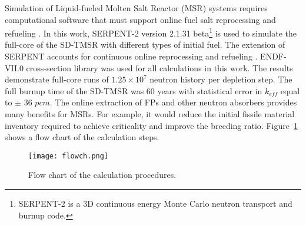 Simulation of Liquid-fueled Molten Salt Reactor (MSR) systems requires 
computational software that must support online fuel salt reprocessing and 
refueling \cite{serp2014molten}. In this work, SERPENT-2 version 2.1.31 
beta\footnote{SERPENT-2 is a 3D continuous energy Monte Carlo neutron 
transport and burnup code.} \cite{leppanen2014serpent} is used to simulate the 
full-core of the SD-TMSR with different types of initial fuel. The extension 
of SERPENT accounts for continuous online reprocessing and refueling 
\cite{aufiero2013extended}. ENDF-VII.0 cross-section library was used for all 
calculations in this work. The results demonstrate full-core runs of 
$1.25\times 10^7$ neutron history per depletion step. The full burnup time of 
the SD-TMSR was 60 years with statistical error in $k_{eff}$ equal to $\pm$ 
$36$ $pcm$. The online extraction of \gls{FPs} and other neutron absorbers 
provides many benefits for MSRs. For example, it would reduce the initial 
fissile material inventory required to achieve criticality and improve the 
breeding ratio. Figure~\ref{fig:flow} shows a flow chart of the calculation 
steps. 

\begin{figure}[t!] %
	\texttt{[image: flowch.png]}
	\caption{Flow chart of the calculation procedures.}
	\label{fig:flow}
\end{figure}

